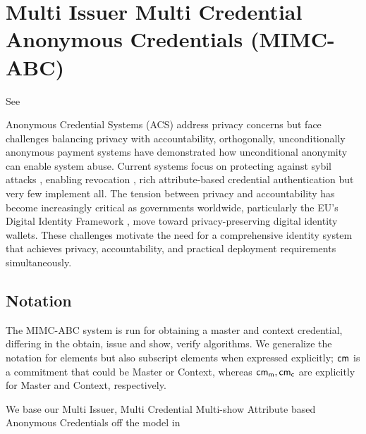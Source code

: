 \cleardoublepage

\section{Multi Issuer Multi Credential Anonymous Credentials (MIMC-ABC)}\label{sec:mimc}
See 

\noindent Anonymous Credential Systems (ACS) \cite{chaum1985security,hutchison_signature_2004, hutchison_constant-size_2006, sako_short_2016, fuchsbauer_structure-preserving_2019} address privacy concerns but face challenges balancing privacy with accountability, orthogonally, unconditionally anonymous payment systems have demonstrated how unconditional anonymity can enable system abuse. Current systems focus on protecting against sybil attacks \cite{crites_syra_2024, rabaninejad_attribute-based_nodate}, enabling revocation \cite{goos_dynamic_2002, robshaw_uc_2016, camenisch_scalable_2016, baldimtsi_accumulators_2017}, rich attribute-based credential authentication \cite{rosenberg_zk-creds_2022, babel_bringing_2023} but very few implement all. The tension between privacy and accountability has become increasingly critical as governments worldwide, particularly the EU's Digital Identity Framework \cite{noauthor_regulation_2024}, move toward privacy-preserving digital identity wallets. These challenges motivate the need for a comprehensive identity system that achieves privacy, accountability, and practical deployment requirements simultaneously.

\subsection{Notation}
The MIMC-ABC system is run for obtaining a master and context credential, differing in the obtain, issue and show, verify algorithms. 
We generalize the notation for elements but also subscript elements when expressed explicitly; $ \mathsf{cm}$ is a commitment that could be Master or Context, whereas $\mathsf{cm_m}, \mathsf{cm_c}$ are explicitly for Master and Context, respectively.

We base our Multi Issuer, Multi Credential Multi-show Attribute based Anonymous Credentials off the model in \cite{fuchsbauer_structure-preserving_2019}

